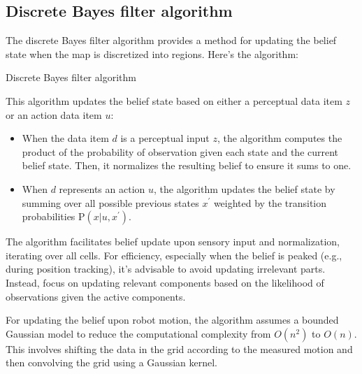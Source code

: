 \subsection{Discrete Bayes filter algorithm}
The discrete Bayes filter algorithm provides a method for updating the belief state when the map is discretized into regions. 
Here's the algorithm:
\begin{algorithm}[H]
    \caption{Discrete Bayes filter algorithm}
        \begin{algorithmic}[1]
                \EndFor
                \EndFor
                \EndFor
            \EndIf
            \State {}
        \end{algorithmic}
\end{algorithm}
This algorithm updates the belief state based on either a perceptual data item $z$ or an action data item $u$: 
\begin{itemize}
    \item When the data item $d$ is a perceptual input $z$, the algorithm computes the product of the probability of observation given each state and the current belief state. 
        Then, it normalizes the resulting belief to ensure it sums to one.
    \item When $d$ represents an action $u$, the algorithm updates the belief state by summing over all possible previous states $x^\prime$ weighted by the transition probabilities $\text{P}(x|u,x^\prime)$.
\end{itemize}
The algorithm facilitates belief update upon sensory input and normalization, iterating over all cells. 
For efficiency, especially when the belief is peaked (e.g., during position tracking), it's advisable to avoid updating irrelevant parts. 
Instead, focus on updating relevant components based on the likelihood of observations given the active components.

For updating the belief upon robot motion, the algorithm assumes a bounded Gaussian model to reduce the computational complexity from $O(n^2)$ to $O(n)$. 
This involves shifting the data in the grid according to the measured motion and then convolving the grid using a Gaussian kernel.